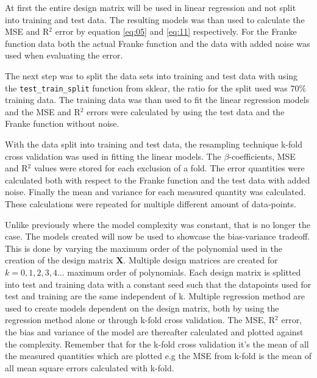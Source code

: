 \documentclass[uio,jmp,amsmath,amssymb,reprint,nofootinbib]{revtex4-1}
\numberwithin{equation}{section}
\begin{document}
At first the entire design matrix will be used in linear regression and not split into training and test data. The resulting models was than used to calculate the MSE and R\(^2\) error by equation \ref{eq:05} and \ref{eq:11} respectively. For the Franke function data both the actual Franke function and the data with added noise was used when evaluating the error.

The next step was to split the data sets into training and test data with using the \texttt{test\_train\_split} function from sklear, the ratio for the split used was \(70\%\) training data. The training data was than used to fit the linear regression models and the MSE and R\(^2\) errors were calculated by using the test data and the Franke function without noise.

With the data split into training and test data, the resampling technique k-fold cross validation was used in fitting the linear models. The \(\beta\)-coefficients, MSE and R\(^2\) values were stored for each exclusion of a fold. The error quantities were calculated both with respect to the Franke function and the test data with added noise. Finally the mean and variance for each measured quantity was calculated. These calculations were repeated for multiple different amount of data-points.

Unlike previously where the model complexity was constant, that is no longer the case. The models created will now be used to showcase the bias-variance tradeoff. This is done by varying the maximum order of the polynomial used in the creation of the design matrix \(\bm{X}\). Multiple design matrices are created for \(k=0,1,2,3,4...\) maximum order of polynomials. Each design matrix is splitted into test and training data with a constant seed such that the datapoints used for test and training are the same independent of k. Multiple regression method are used to create models dependent on the design matrix, both by using the regression method alone or through k-fold cross validation. The MSE, R\(^2\) error, the bias and variance of the model are thereafter calculated and plotted against the complexity. Remember that for the k-fold cross validation it's the mean of all the measured quantities which are plotted e.g the MSE from k-fold is the mean of all mean square errors calculated with k-fold.


\end{document}
